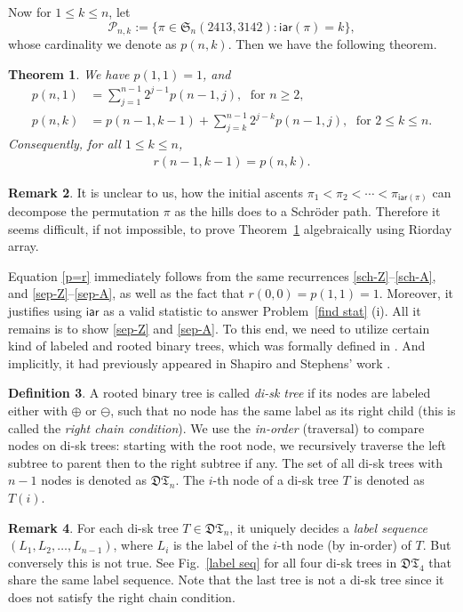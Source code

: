 \documentclass[11pt,reqno]{amsart}
\numberwithin{equation}{section}
\theoremstyle{plain}
\newtheorem{theorem}{Theorem}[section]
\theoremstyle{definition}
\newtheorem{Def}[theorem]{Definition}
\newtheorem{remark}[theorem]{Remark}
\newcommand{\PP}{\mathcal{P}}
\def\iar{\mathsf{iar}}
\begin{document}
Now for $1\le k\le n$, let $$\PP_{n,k}:=\{\pi\in\mathfrak{S}_n(2413,3142):\iar(\pi)=k\},$$ whose cardinality we denote as $p(n,k)$. Then we have the following theorem.
\begin{theorem}\label{Sep-iar}
We have $p(1,1)=1$, and
\begin{align}
p(n,1) &=\sum_{j=1}^{n-1}2^{j-1}p(n-1,j), \; \text{ for }n\ge 2,\label{sep-Z}\\
p(n,k) &=p(n-1,k-1)+\sum_{j=k}^{n-1}2^{j-k}p(n-1,j),\; \text{ for }2\le k \le n.\label{sep-A}
\end{align}
Consequently, for all $1\le k\le n$,
\begin{align}
r(n-1,k-1)=p(n,k).\label{p=r}
\end{align}
\end{theorem}
\begin{remark}
It is unclear to us, how the initial ascents $\pi_1<\pi_2<\cdots<\pi_{\iar(\pi)}$ can decompose the permutation $\pi$ as the hills does to a Schr\"oder path. Therefore it seems difficult, if not impossible, to prove Theorem~\ref{Sep-iar} algebraically using Riorday array.
\end{remark}
Equation \eqref{p=r} immediately follows from the same recurrences \eqref{sch-Z}--\eqref{sch-A}, and \eqref{sep-Z}--\eqref{sep-A}, as well as the fact that $r(0,0)=p(1,1)=1$. Moreover, it justifies using $\iar$ as a valid statistic to answer Problem~\ref{find stat} (i). All it remains is to show \eqref{sep-Z} and \eqref{sep-A}. To this end, we need to utilize certain kind of labeled and rooted binary trees, which was formally defined in \cite{FLZ}. And implicitly, it had previously appeared in Shapiro and Stephens' work \cite{SS}.
\begin{Def}{\cite[Def.~2.2]{FLZ}}
A rooted binary tree is called \emph{di-sk tree} if its nodes are labeled either with $\oplus$ or $\ominus$, such that no node has the same label as its right child (this is called the \emph{right chain condition}). We use the \emph{in-order} (traversal) to compare nodes on di-sk trees: starting with the root node, we recursively traverse the left subtree to parent then to the right subtree if any. The set of all di-sk trees with $n-1$ nodes is denoted as $\mathfrak{DT}_{n}$. The $i$-th node of a di-sk tree $T$ is denoted as $T(i)$.
\end{Def}
\begin{remark}
For each di-sk tree $T\in\mathfrak{DT}_n$, it uniquely decides a \emph{label sequence} $(L_1,L_2,\ldots,L_{n-1})$, where $L_i$ is the label of the $i$-th node (by in-order) of $T$. But conversely this is not true. See Fig.~\ref{label seq} for all four di-sk trees in $\mathfrak{DT}_{4}$ that share the same label sequence. Note that the last tree is not a di-sk tree since it does not satisfy the right chain condition.
\end{remark}
\end{document}
